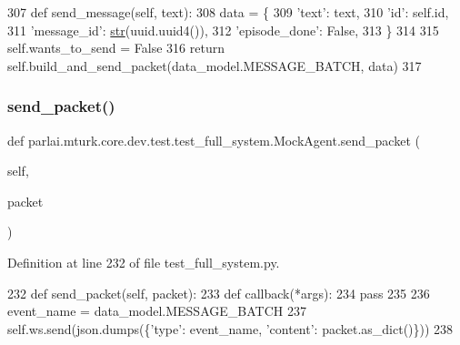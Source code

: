 \begin{DoxyCode}
307     \textcolor{keyword}{def }send\_message(self, text):
308         data = \{
309             \textcolor{stringliteral}{'text'}: text,
310             \textcolor{stringliteral}{'id'}: self.id,
311             \textcolor{stringliteral}{'message\_id'}: \hyperlink{namespacegenerate__task__READMEs_a5b88452ffb87b78c8c85ececebafc09f}{str}(uuid.uuid4()),
312             \textcolor{stringliteral}{'episode\_done'}: \textcolor{keyword}{False},
313         \}
314 
315         self.wants\_to\_send = \textcolor{keyword}{False}
316         \textcolor{keywordflow}{return} self.build\_and\_send\_packet(data\_model.MESSAGE\_BATCH, data)
317 
\end{DoxyCode}
\mbox{\label{classparlai_1_1mturk_1_1core_1_1dev_1_1test_1_1test__full__system_1_1MockAgent_a439c09f491611c9d91aea875f44ac435}} 
\subsubsection{\texorpdfstring{send\+\_\+packet()}{send\_packet()}}
{\footnotesize\ttfamily def parlai.\+mturk.\+core.\+dev.\+test.\+test\+\_\+full\+\_\+system.\+Mock\+Agent.\+send\+\_\+packet (\begin{DoxyParamCaption}\item[{}]{self,  }\item[{}]{packet }\end{DoxyParamCaption})}



Definition at line 232 of file test\+\_\+full\+\_\+system.\+py.


\begin{DoxyCode}
232     \textcolor{keyword}{def }send\_packet(self, packet):
233         \textcolor{keyword}{def }callback(*args):
234             \textcolor{keywordflow}{pass}
235 
236         event\_name = data\_model.MESSAGE\_BATCH
237         self.ws.send(json.dumps(\{\textcolor{stringliteral}{'type'}: event\_name, \textcolor{stringliteral}{'content'}: packet.as\_dict()\}))
238 
\end{DoxyCode}


